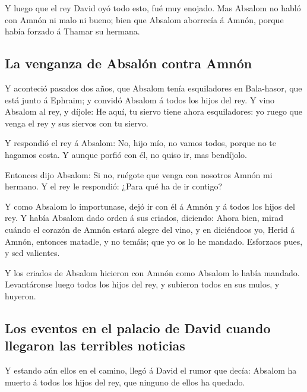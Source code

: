  Y luego que el rey David oyó todo esto, fué muy enojado.
 Mas Absalom no habló con Amnón ni malo ni bueno; bien
que Absalom aborrecía á Amnón, porque había forzado á Thamar su hermana.

\hypertarget{la-venganza-de-absaluxf3n-contra-amnuxf3n}{%
\subsection{La venganza de Absalón contra
Amnón}\label{la-venganza-de-absaluxf3n-contra-amnuxf3n}}

 Y aconteció pasados dos años, que Absalom tenía
esquiladores en Bala-hasor, que está junto á Ephraim; y convidó Absalom
á todos los hijos del rey.  Y vino Absalom al rey, y
díjole: He aquí, tu siervo tiene ahora esquiladores: yo ruego que venga
el rey y sus siervos con tu siervo.

 Y respondió el rey á Absalom: No, hijo mío, no vamos
todos, porque no te hagamos costa. Y aunque porfió con él, no quiso ir,
mas bendíjolo.

 Entonces dijo Absalom: Si no, ruégote que venga con
nosotros Amnón mi hermano. Y el rey le respondió: ¿Para qué ha de ir
contigo?

 Y como Absalom lo importunase, dejó ir con él á Amnón y
á todos los hijos del rey.  Y había Absalom dado orden á
sus criados, diciendo: Ahora bien, mirad cuándo el corazón de Amnón
estará alegre del vino, y en diciéndoos yo, Herid á Amnón, entonces
matadle, y no temáis; que yo os lo he mandado. Esforzaos pues, y sed
valientes.

 Y los criados de Absalom hicieron con Amnón como Absalom
lo había mandado. Levantáronse luego todos los hijos del rey, y subieron
todos en sus mulos, y huyeron.

\hypertarget{los-eventos-en-el-palacio-de-david-cuando-llegaron-las-terribles-noticias}{%
\subsection{Los eventos en el palacio de David cuando llegaron las
terribles
noticias}\label{los-eventos-en-el-palacio-de-david-cuando-llegaron-las-terribles-noticias}}

 Y estando aún ellos en el camino, llegó á David el rumor
que decía: Absalom ha muerto á todos los hijos del rey, que ninguno de
ellos ha quedado.

